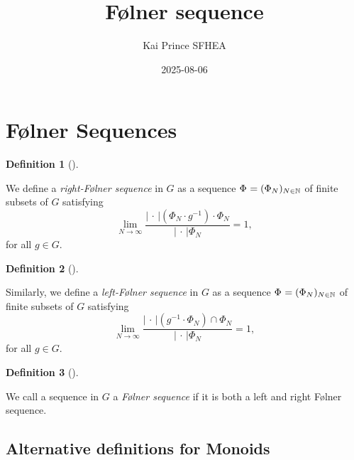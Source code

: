 \documentclass[
  british,
]{article}
\title{Følner sequence}
\author{Kai Prince SFHEA}
\date{2025-08-06}
\renewcommand*\contentsname{Table of contents}
\newcommand\contentsname{Table of contents}
\theoremstyle{plain}
\theoremstyle{definition}
\newtheorem{definition}{Definition}[section]
\theoremstyle{remark}
\newcommand{\GroupElement}{{g}}
\newcommand{\Inverse}[1]{{#1}^{-1}}
\newcommand{\Folner}[1][\vphantom{}]{{\Phi}_{#1}}
\newcommand{\GroupOperation}[2]{{#1}\cdot{#2}}
\newcommand{\Group}{{G}}
\newcommand{\CountingMeasure}[1][\,\cdot\,]{{\left|#1\right|}}
\begin{document}
\maketitle

\renewcommand*\contentsname{Table of contents}
{
\hypersetup{linkcolor=}
\setcounter{tocdepth}{3}
\tableofcontents
}

\section{Følner Sequences}\label{fuxf8lner-sequences}

\begin{definition}[]\protect\hypertarget{def-rightFolner}{}\label{def-rightFolner}

We define a \emph{right-Følner sequence} in \(\Group\) as a sequence
\(\Folner =(\Folner[N])_{N\in\mathbb{N}}\) of finite subsets of
\(\Group\) satisfying
\[\lim_{N\rightarrow\infty}\frac{\CountingMeasure{\GroupOperation{(\GroupOperation{\Folner[N]}{\Inverse{\GroupElement}})}{\Folner[N]}}}{\CountingMeasure{\Folner[N]}}=1,\]
for all \(\GroupElement\in\Group\).

\end{definition}

\begin{definition}[]\protect\hypertarget{def-leftFolner}{}\label{def-leftFolner}

Similarly, we define a \emph{left-Følner sequence} in \(\Group\) as a
sequence \(\Folner =(\Folner[N])_{N\in\mathbb{N}}\) of finite subsets of
\(\Group\) satisfying
\[\lim_{N\rightarrow\infty}\frac{\CountingMeasure{(\Inverse{\GroupElement}\cdot\Folner[N])\cap\Folner[N]}}{\CountingMeasure{\Folner[N]}}=1,\]
for all \(\GroupElement\in\Group\).

\end{definition}

\begin{definition}[]\protect\hypertarget{def-Folner}{}\label{def-Folner}

We call a sequence in \(\Group\) a \emph{Følner sequence} if it is both
a left and right Følner sequence.

\end{definition}

\subsection{Alternative definitions for
Monoids}\label{alternative-definitions-for-monoids}
\end{document}
